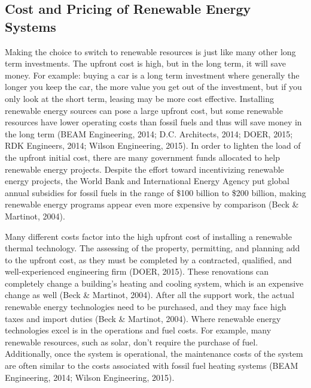     \subsection{Cost and Pricing of Renewable Energy Systems}
    \par Making the choice to switch to renewable resources is just like many other long term investments. The upfront cost is high, but in the long term, it will save money. For example: buying a car is a long term investment where generally the longer you keep the car, the more value you get out of the investment, but if you only look at the short term, leasing may be more cost effective. Installing renewable energy sources can pose a large upfront cost, but some renewable resources have lower operating costs than fossil fuels and thus will save money in the long term (BEAM Engineering, 2014; D.C. Architects, 2014; DOER, 2015; RDK Engineers, 2014; Wilson Engineering, 2015). In order to lighten the load of the upfront initial cost, there are many government funds allocated to help renewable energy projects. Despite the effort toward incentivizing renewable energy projects, the World Bank and International Energy Agency put global annual subsidies for fossil fuels in the range of \$100 billion to \$200 billion, making renewable energy programs appear even more expensive by comparison (Beck \& Martinot, 2004).
    \par Many different costs factor into the high upfront cost of installing a renewable thermal technology. The assessing of the property, permitting, and planning add to the upfront cost, as they must be completed by a contracted, qualified, and well-experienced engineering firm (DOER, 2015). These renovations can completely change a building's heating and cooling system, which is an expensive change as well (Beck \& Martinot, 2004). After all the support work, the actual renewable energy technologies need to be purchased, and they may face high taxes and import duties (Beck \& Martinot, 2004). Where renewable energy technologies excel is in the operations and fuel costs. For example, many renewable resources, such as solar, don't require the purchase of fuel. Additionally, once the system is operational, the maintenance costs of the system are often similar to the costs associated with fossil fuel heating systems (BEAM Engineering, 2014; Wilson Engineering, 2015).

